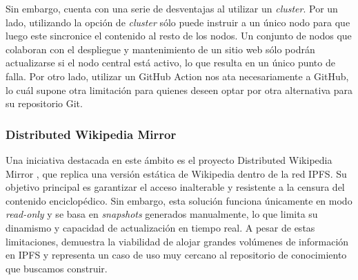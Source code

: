 Sin embargo, cuenta con una serie de desventajas al utilizar un \textit{cluster}. Por un lado, utilizando la opción de \textit{cluster} sólo puede instruir a un único nodo para que luego este sincronice el contenido al resto de los nodos. Un conjunto de nodos que colaboran con el despliegue y mantenimiento de un sitio web sólo podrán actualizarse si el nodo central está activo, lo que resulta en un único punto de falla. Por otro lado, utilizar un GitHub Action nos ata necesariamente a GitHub, lo cuál supone otra limitación para quienes deseen optar por otra alternativa para su repositorio Git.

\subsubsection{Distributed Wikipedia Mirror}

Una iniciativa destacada en este ámbito es el proyecto Distributed Wikipedia Mirror \cite{distributed-wikipedia-mirror}, que replica una versión estática de Wikipedia dentro de la red IPFS. Su objetivo principal es garantizar el acceso inalterable y resistente a la censura del contenido enciclopédico. Sin embargo, esta solución funciona únicamente en modo \textit{read-only} y se basa en \textit{snapshots} generados manualmente, lo que limita su dinamismo y capacidad de actualización en tiempo real. A pesar de estas limitaciones, demuestra la viabilidad de alojar grandes volúmenes de información en IPFS y representa un caso de uso muy cercano al repositorio de conocimiento que buscamos construir.